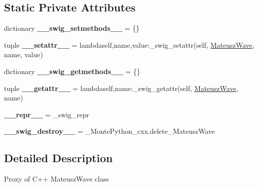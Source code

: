 \subsection*{Static Private Attributes}
\begin{DoxyCompactItemize}
\item 
\hypertarget{classMontePython__cxx_1_1MateuszWave_ab2e52f9c7aa5df9b76c17da7b2930a51}{}dictionary {\bfseries \+\_\+\+\_\+swig\+\_\+setmethods\+\_\+\+\_\+} = \{\}\label{classMontePython__cxx_1_1MateuszWave_ab2e52f9c7aa5df9b76c17da7b2930a51}

\item 
\hypertarget{classMontePython__cxx_1_1MateuszWave_ad8f57e18e6b4b55449828e59b29d5f69}{}tuple {\bfseries \+\_\+\+\_\+setattr\+\_\+\+\_\+} = lambdaself,name,value\+:\+\_\+swig\+\_\+setattr(self, \hyperlink{classMontePython__cxx_1_1MateuszWave}{Mateusz\+Wave}, name, value)\label{classMontePython__cxx_1_1MateuszWave_ad8f57e18e6b4b55449828e59b29d5f69}

\item 
\hypertarget{classMontePython__cxx_1_1MateuszWave_a68533aa6fa641a758e83be51b5332505}{}dictionary {\bfseries \+\_\+\+\_\+swig\+\_\+getmethods\+\_\+\+\_\+} = \{\}\label{classMontePython__cxx_1_1MateuszWave_a68533aa6fa641a758e83be51b5332505}

\item 
\hypertarget{classMontePython__cxx_1_1MateuszWave_a41b61616903308c373a461e8c0954614}{}tuple {\bfseries \+\_\+\+\_\+getattr\+\_\+\+\_\+} = lambdaself,name\+:\+\_\+swig\+\_\+getattr(self, \hyperlink{classMontePython__cxx_1_1MateuszWave}{Mateusz\+Wave}, name)\label{classMontePython__cxx_1_1MateuszWave_a41b61616903308c373a461e8c0954614}

\item 
\hypertarget{classMontePython__cxx_1_1MateuszWave_aba9cf9af146411882ef68951645b8017}{}{\bfseries \+\_\+\+\_\+repr\+\_\+\+\_\+} = \+\_\+swig\+\_\+repr\label{classMontePython__cxx_1_1MateuszWave_aba9cf9af146411882ef68951645b8017}

\item 
\hypertarget{classMontePython__cxx_1_1MateuszWave_a5f01de4a6d7564a736156d89a835b54c}{}{\bfseries \+\_\+\+\_\+swig\+\_\+destroy\+\_\+\+\_\+} = \+\_\+\+Monte\+Python\+\_\+cxx.\+delete\+\_\+\+Mateusz\+Wave\label{classMontePython__cxx_1_1MateuszWave_a5f01de4a6d7564a736156d89a835b54c}

\end{DoxyCompactItemize}


\subsection{Detailed Description}
\begin{DoxyVerb}Proxy of C++ MateuszWave class\end{DoxyVerb}
 

